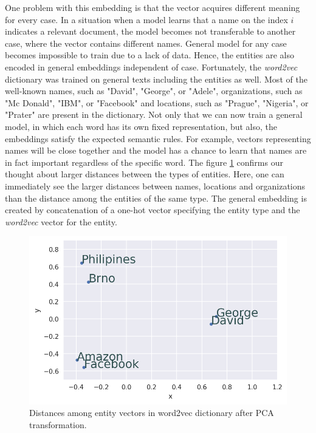 \documentclass[
  digital, %
  notable,   %
  nolof,     %
  nolot,     %
  draft
]{fithesis3}
\begin{document}
One problem with this embedding is that the vector acquires different meaning for every case.
In a situation when a model learns that a name on the index $i$ indicates a relevant document, the model becomes not transferable to another case, where the vector contains different names.
General model for any case becomes impossible to train due to a lack of data.
Hence, the entities are also encoded in general embeddings independent of case.
Fortunately, the \textit{word2vec} dictionary was trained on general texts including the entities as well.
Most of the well-known names, such as "David", "George", or "Adele", organizations, such as "Mc Donald", "IBM", or "Facebook" and locations, such as "Prague", "Nigeria", or "Prater" are present in the dictionary.
Not only that we can now train a general model, in which each word has its own fixed representation, but also, the embeddings satisfy the expected semantic rules.
For example, vectors representing names will be close together and the model has a chance to learn that names are in fact important regardless of the specific word.
The figure \ref{fig:entity_distances} confirms our thought about larger distances between the types of entities.
Here, one can immediately see the larger distances between names, locations and organizations than the distance among the entities of the same type.
The general embedding is created by concatenation of a one-hot vector specifying the entity type and the \textit{word2vec} vector for the entity.

\begin{figure}[h]
\centering
\caption{Distances among entity vectors in word2vec dictionary after PCA transformation.}
\label{fig:entity_distances}
\includegraphics[width=\textwidth]{img/entities_distances}
\end{figure}
\end{document}
